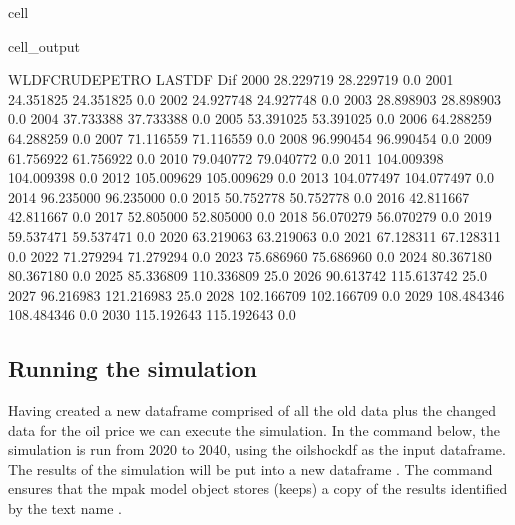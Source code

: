 \documentclass[letterpaper,10pt,english]{jupyterBook}
\begin{document}
\begin{sphinxuseclass}{cell}
\begin{sphinxVerbatimOutput}
\begin{sphinxuseclass}{cell_output}
\begin{sphinxVerbatim}[commandchars=\\\{\}]
      WLDFCRUDE\PYGZus{}PETRO      LASTDF   Dif
2000        28.229719   28.229719   0.0
2001        24.351825   24.351825   0.0
2002        24.927748   24.927748   0.0
2003        28.898903   28.898903   0.0
2004        37.733388   37.733388   0.0
2005        53.391025   53.391025   0.0
2006        64.288259   64.288259   0.0
2007        71.116559   71.116559   0.0
2008        96.990454   96.990454   0.0
2009        61.756922   61.756922   0.0
2010        79.040772   79.040772   0.0
2011       104.009398  104.009398   0.0
2012       105.009629  105.009629   0.0
2013       104.077497  104.077497   0.0
2014        96.235000   96.235000   0.0
2015        50.752778   50.752778   0.0
2016        42.811667   42.811667   0.0
2017        52.805000   52.805000   0.0
2018        56.070279   56.070279   0.0
2019        59.537471   59.537471   0.0
2020        63.219063   63.219063   0.0
2021        67.128311   67.128311   0.0
2022        71.279294   71.279294   0.0
2023        75.686960   75.686960   0.0
2024        80.367180   80.367180   0.0
2025        85.336809  110.336809  25.0
2026        90.613742  115.613742  25.0
2027        96.216983  121.216983  25.0
2028       102.166709  102.166709   0.0
2029       108.484346  108.484346   0.0
2030       115.192643  115.192643   0.0
\end{sphinxVerbatim}

\end{sphinxuseclass}\end{sphinxVerbatimOutput}

\end{sphinxuseclass}

\subsection{Running the simulation}
\label{\detokenize{content/06_WBModels/LoadingWBModel:running-the-simulation}}
\sphinxAtStartPar
Having created a new dataframe comprised of all the old data plus the changed data for the oil price we can execute the simulation.  In the command below, the simulation is run from 2020 to 2040, using the oilshockdf as the input dataframe.  The results of the simulation will be put into a new dataframe .  The  command ensures that the mpak model object stores (keeps) a copy of the results identified by the text name .
\end{document}
